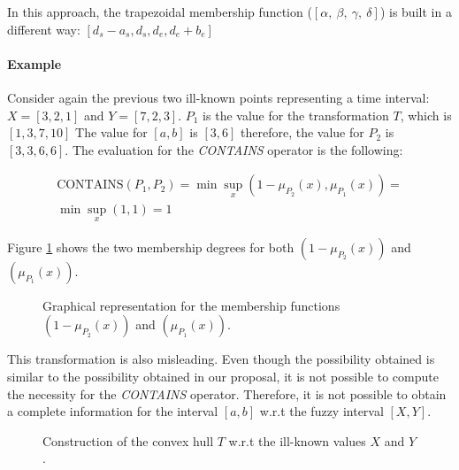 \documentclass[twoside,twocolumn,a4paper]{article}
\begin{document}
In this approach, the trapezoidal membership function ($\left[\alpha,\ \beta,\ \gamma,\ \delta\right]$) is built in a different way: $\left[d_s - a_s,d_s,d_e,d_e + b_e \right]$


\paragraph{Example}
Consider again the previous two ill-known points representing a time interval:  $X = \left[3, 2, 1\right]$ and $Y = \left[7, 2, 3 \right]$.
$P_1$ is the value for the transformation $T$, which is $\left[1,3,7,10 \right]$ 
The value for $\left[a, b \right]$ is $\left[3,6 \right]$ therefore, the value for $P_2$ is $\left[3,3,6,6 \right]$. 
The evaluation for the \emph{CONTAINS} operator is the following:

\begin{eqnarray}
\nonumber
\mbox{CONTAINS}\left(P_1,P_2 \right) = \min \sup_{x} \left(1-\mu_{P_2}(x),\mu_{P_1}(x) \right) = \\
\nonumber
\min \sup_{x} \left(1,1 \right) = 1
\end{eqnarray}

Figure \ref{fig:example_ch} shows the two membership degrees for both $\left(1-\mu_{P_2}(x)\right)$ and $\left( \mu_{P_1}(x) \right)$.

\begin{figure}[h!]
  \centering
  
  \caption{Graphical representation for the membership functions $\left(1-\mu_{P_2}(x)\right)$ and $\left( \mu_{P_1}(x) \right) $.}
  \label{fig:example_ch}
\end{figure}

This transformation is also misleading. Even though the possibility obtained is similar to the possibility obtained in our proposal, it is not possible to compute the necessity for the \emph{CONTAINS} operator. Therefore, it is not possible to obtain a complete information for the interval $[a,b]$ w.r.t the fuzzy interval $[X,Y]$.

\begin{figure}[h!]
  \centering
 
  \caption{Construction of the convex hull $T$ w.r.t the ill-known values $X$ and $Y$.}
  \label{fig:convex-hull-T}
\end{figure}
\end{document}
